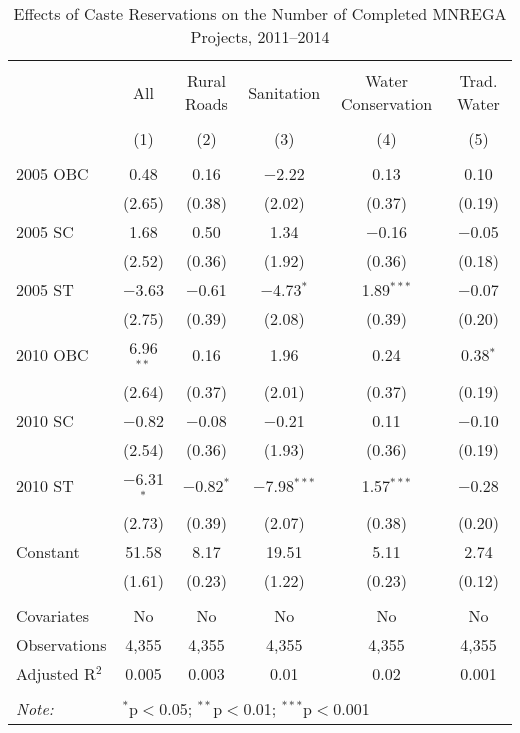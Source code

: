 \begin{table}[!htbp]
\centering
\begin{threeparttable}

  \caption{Effects of Caste Reservations on the Number of Completed MNREGA Projects, 2011--2014} 
  \label{main_caste_mnrega} 
\scriptsize 
\begin{tabular}{@{\extracolsep{0pt}}lccccc} 
\\[-1.8ex]\hline 
\hline \\[-1.8ex] 
 & All & Rural Roads & Sanitation & Water Conservation & Trad. Water \\ 
\\[-1.8ex] & (1) & (2) & (3) & (4) & (5)\\ 
\hline \\[-1.8ex] 
 2005 OBC & 0.48 & 0.16 & $-$2.22 & 0.13 & 0.10 \\ 
  & (2.65) & (0.38) & (2.02) & (0.37) & (0.19) \\ 
  2005 SC & 1.68 & 0.50 & 1.34 & $-$0.16 & $-$0.05 \\ 
  & (2.52) & (0.36) & (1.92) & (0.36) & (0.18) \\ 
  2005 ST & $-$3.63 & $-$0.61 & $-$4.73$^{*}$ & 1.89$^{***}$ & $-$0.07 \\ 
  & (2.75) & (0.39) & (2.08) & (0.39) & (0.20) \\ 
  2010 OBC & 6.96$^{**}$ & 0.16 & 1.96 & 0.24 & 0.38$^{*}$ \\ 
  & (2.64) & (0.37) & (2.01) & (0.37) & (0.19) \\ 
  2010 SC & $-$0.82 & $-$0.08 & $-$0.21 & 0.11 & $-$0.10 \\ 
  & (2.54) & (0.36) & (1.93) & (0.36) & (0.19) \\ 
  2010 ST & $-$6.31$^{*}$ & $-$0.82$^{*}$ & $-$7.98$^{***}$ & 1.57$^{***}$ & $-$0.28 \\ 
  & (2.73) & (0.39) & (2.07) & (0.38) & (0.20) \\ 
  Constant & 51.58 & 8.17 & 19.51 & 5.11 & 2.74 \\ 
  & (1.61) & (0.23) & (1.22) & (0.23) & (0.12) \\ 
 \hline \\[-1.8ex] 
Covariates & No & No & No & No & No \\ 
Observations & 4,355 & 4,355 & 4,355 & 4,355 & 4,355 \\ 
Adjusted R$^{2}$ & 0.005 & 0.003 & 0.01 & 0.02 & 0.001 \\ 
\hline 
\hline \\[-1.8ex] 
\textit{Note:}  & \multicolumn{5}{l}{$^{*}$p$<$0.05; $^{**}$p$<$0.01; $^{***}$p$<$0.001} \\ 

\end{tabular}
\end{threeparttable}
\end{table}
